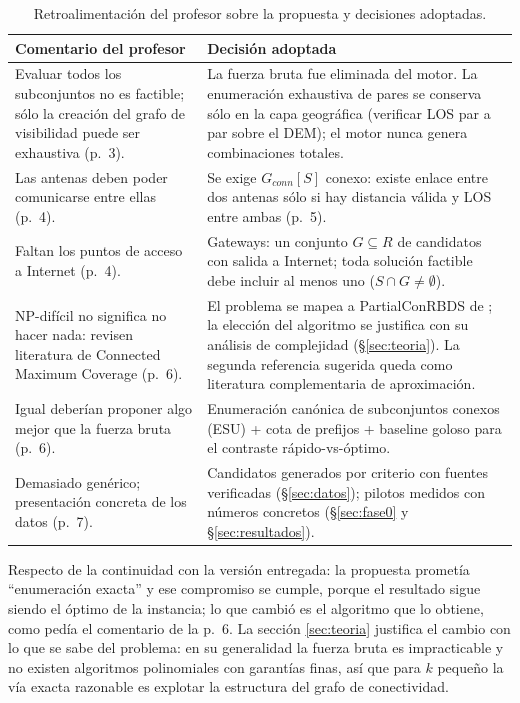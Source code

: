 \documentclass[12pt,letterpaper]{article}
\begin{document}
\begin{table}[H]
\centering\small
\begin{tabular}{p{5.4cm}p{9.2cm}}
\toprule
\textbf{Comentario del profesor} & \textbf{Decisión adoptada} \\
\midrule
Evaluar todos los subconjuntos no es factible; sólo la creación del grafo de visibilidad puede ser exhaustiva (p.~3). & La fuerza bruta fue eliminada del motor. La enumeración exhaustiva de pares se conserva sólo en la capa geográfica (verificar LOS par a par sobre el DEM); el motor nunca genera combinaciones totales. \\
Las antenas deben poder comunicarse entre ellas (p.~4). & Se exige $G_{conn}[S]$ conexo: existe enlace entre dos antenas sólo si hay distancia válida y LOS entre ambas (p.~5). \\
Faltan los puntos de acceso a Internet (p.~4). & Gateways: un conjunto $G \subseteq R$ de candidatos con salida a Internet; toda solución factible debe incluir al menos uno ($S \cap G \neq \emptyset$). \\
NP-difícil no significa no hacer nada: revisen literatura de Connected Maximum Coverage (p.~6). & El problema se mapea a PartialConRBDS de \cite{itcs2026}; la elección del algoritmo se justifica con su análisis de complejidad (§\ref{sec:teoria}). La segunda referencia sugerida \cite{dangelo2025} queda como literatura complementaria de aproximación. \\
Igual deberían proponer algo mejor que la fuerza bruta (p.~6). & Enumeración canónica de subconjuntos conexos (ESU) + cota de prefijos + baseline goloso para el contraste rápido-vs-óptimo. \\
Demasiado genérico; presentación concreta de los datos (p.~7). & Candidatos generados por criterio con fuentes verificadas (§\ref{sec:datos}); pilotos medidos con números concretos (§\ref{sec:fase0} y §\ref{sec:resultados}). \\
\bottomrule
\end{tabular}
\caption{Retroalimentación del profesor sobre la propuesta y decisiones adoptadas.}
\label{tab:retro}
\end{table}

Respecto de la continuidad con la versión entregada: la propuesta prometía ``enumeración exacta'' y ese compromiso se cumple, porque el resultado sigue siendo el óptimo de la instancia; lo que cambió es el algoritmo que lo obtiene, como pedía el comentario de la p.~6. La sección \ref{sec:teoria} justifica el cambio con lo que se sabe del problema: en su generalidad la fuerza bruta es impracticable y no existen algoritmos polinomiales con garantías finas, así que para $k$ pequeño la vía exacta razonable es explotar la estructura del grafo de conectividad.
\end{document}
